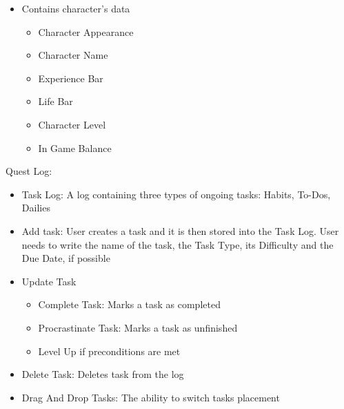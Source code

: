 \documentclass[12pt]{report}
\renewcommand{\_}{\kern-1.5pt\textunderscore\kern-1.5pt}
\begin{document}
\begin{itemize}
	\item Contains character’s data\par

\begin{itemize}
	\item Character Appearance \par

	\item Character Name\par

	\item Experience Bar\par

	\item Life Bar\par

	\item Character Level\par

	\item In Game Balance\par
\end{itemize}
\end{itemize}

\vspace{\baselineskip}
Quest Log:\par

\begin{itemize}
	\item Task Log: A log containing three types of ongoing tasks: Habits, To-Dos, Dailies\par

	\item Add task: User creates a task and it is then stored into the Task Log. User needs to write the name of the task, the Task Type, its Difficulty and the Due Date, if possible\par

	\item Update Task\par

\begin{itemize}
	\item Complete Task: Marks a task as completed \par

	\item Procrastinate Task: Marks a task as unfinished\par

	\item Level Up if preconditions are met\par


\end{itemize}
	\item Delete Task: Deletes task from the log\par

	\item Drag And Drop Tasks: The ability to switch tasks placement
\end{itemize}\par
\end{document}
